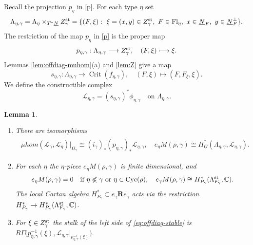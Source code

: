 \documentclass[11pt,reqno]{amsart}
\newtheorem{Lemma}[Theorem]{Lemma}
\theoremstyle{definition}
\theoremstyle{remark}
\def\bbC{\mathbb C}
\def\dN{\underline N}
\def\dG{\underline G}
\def\Fl{\mathrm{Fl}}
\def\Cyc{\operatorname{Cyc}}
\def\muhom{\mu hom}
\def\bR{\mathbf R}
\begin{document}
Recall the projection $p_\eta$ in \eqref{p}. For each type $\eta$ set
\begin{align}\label{LL}
\begin{split}
\Lambda_{\eta,\gamma}
 =\Lambda_\eta\times_{T^*\dN}Z_\gamma^{\rm st}
 =\{(F,\xi):\ \xi=(x,y)\in Z_\gamma^{\rm st},\ F\in\Fl_\eta,
       \ x\in\dN_F,\ y\in\dN_F^\perp\}.
\end{split}
\end{align}
The restriction of the map $p_\eta$ in \eqref{p} is the proper map
\begin{align}\label{PEG1}
p_{\eta,\gamma}:\Lambda_{\eta,\gamma}\longrightarrow Z_\gamma^{\rm st},
\quad (F,\xi)\longmapsto\xi.
\end{align}
Lemmas \ref{lem:offdiag-muhom}(a) and \ref{lem:Z} give a map
\[
s_{\eta,\gamma}:\Lambda_{\eta,\gamma}\longrightarrow
\operatorname{Crit}(f_{\eta,\gamma}),\quad
(F,\xi)\longmapsto(F,F_\xi,\xi).
\]
We define the constructible complex
\[
\mathscr L_{\eta,\gamma}=(s_{\eta,\gamma})^*\phi_{\eta,\gamma}
\quad\text{on }\Lambda_{\eta,\gamma}.
\]

\begin{Lemma}
\label{lem:microlocal-flag-module}\hfill
\begin{enumerate}[label=$\mathrm{(\alph*)}$,leftmargin=8mm]
\item
There are isomorphisms
\begin{align}\label{eq:offdiag-stable}
\begin{split}
 \muhom(\mathscr L_\gamma,\mathscr L_\eta)|_{\Omega_\gamma}
 \cong (i_\gamma)_*(p_{\eta,\gamma})_*\mathscr L_{\eta,\gamma},\quad
 e_\eta M(\rho,\gamma)\cong H_{\dG}^*(\Lambda_{\eta,\gamma},\mathscr L_{\eta,\gamma}).
\end{split}
\end{align}

\item
For each $\eta$ the $\eta$-piece $e_\eta M(\rho,\gamma)$ is finite dimensional, and
\[
 e_\eta M(\rho,\gamma)=0\quad\text{if }\eta\not\leqslant\gamma
                           \text{ or }\eta\in\Cyc(\rho),
\quad
 e_\gamma M(\rho,\gamma)\cong H^*_{P_\gamma}(\Lambda^{\rm st}_{F_\gamma},\bbC).
\]
The local Cartan algebra $H^*_{P_\gamma}\subset e_\gamma \bR e_\gamma$  acts via the restriction
$H^*_{P_\gamma}\to H^*_{P_\gamma}(\Lambda^{\rm st}_{F_\gamma},\bbC)$.

\item
For $\xi\in Z_\gamma^{\rm st}$ the stalk of the left side of
\eqref{eq:offdiag-stable} is
$R\Gamma\bigl(p_{\eta,\gamma}^{-1}(\xi),
 \mathscr L_{\eta,\gamma}|_{p_{\eta,\gamma}^{-1}(\xi)}\bigr).$
\end{enumerate}
\end{Lemma}
\end{document}
